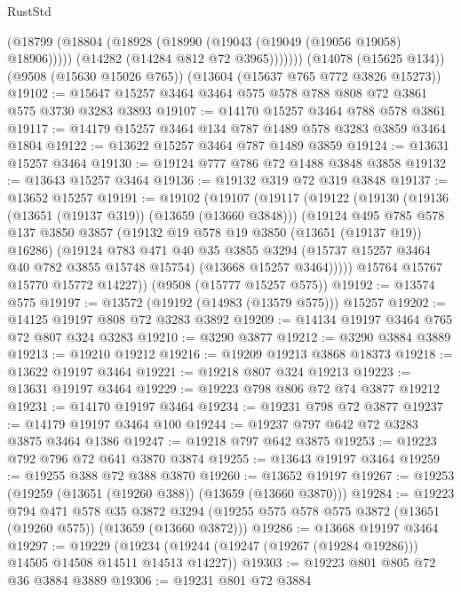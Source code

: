 \begin{lexlean}{RustStd}
\begin{coremodule}
            (@18799
              (@18804 (@18928 (@18990 (@19043 (@19049 (@19056 @19058) @18906)))))
              (@14282 (@14284 @812 @72 @3965)))))))
    (@14078 (@15625 @134))
    (@9508 (@15630 @15026 @765))
    (@13604 (@15637 @765 @772 @3826 @15273))
@19102 := @15647 @15257 @3464 @3464 @575 @578 @788 @808 @72 @3861 @575 @3730 @3283 @3893
@19107 := @14170 @15257 @3464 @788 @578 @3861
@19117 := @14179 @15257 @3464 @134 @787 @1489 @578 @3283 @3859 @3464 @1804
@19122 := @13622 @15257 @3464 @787 @1489 @3859
@19124 := @13631 @15257 @3464
@19130 := @19124 @777 @786 @72 @1488 @3848 @3858
@19132 := @13643 @15257 @3464
@19136 := @19132 @319 @72 @319 @3848
@19137 := @13652 @15257
@19191 := @19102
    (@19107
      (@19117
        (@19122
          (@19130
            (@19136 (@13651 (@19137 @319)) (@13659 (@13660 @3848)))
            (@19124
              @495
              @785
              @578
              @137
              @3850
              @3857
              (@19132 @19 @578 @19 @3850 (@13651 (@19137 @19)) @16286)
              (@19124
                @783
                @471
                @40
                @35
                @3855
                @3294
                (@15737 @15257 @3464 @40 @782 @3855 @15748 @15754)
                (@13668 @15257 @3464)))))
        @15764
        @15767
        @15770
        @15772
        @14227))
    (@9508 (@15777 @15257 @575))
@19192 := @13574 @575
@19197 := @13572 (@19192 (@14983 (@13579 @575))) @15257
@19202 := @14125 @19197 @808 @72 @3283 @3892
@19209 := @14134 @19197 @3464 @765 @72 @807 @324 @3283
@19210 := @3290 @3877
@19212 := @3290 @3884 @3889
@19213 := @19210 @19212
@19216 := @19209 @19213 @3868 @18373
@19218 := @13622 @19197 @3464
@19221 := @19218 @807 @324 @19213
@19223 := @13631 @19197 @3464
@19229 := @19223 @798 @806 @72 @74 @3877 @19212
@19231 := @14170 @19197 @3464
@19234 := @19231 @798 @72 @3877
@19237 := @14179 @19197 @3464 @100
@19244 := @19237 @797 @642 @72 @3283 @3875 @3464 @1386
@19247 := @19218 @797 @642 @3875
@19253 := @19223 @792 @796 @72 @641 @3870 @3874
@19255 := @13643 @19197 @3464
@19259 := @19255 @388 @72 @388 @3870
@19260 := @13652 @19197
@19267 := @19253 (@19259 (@13651 (@19260 @388)) (@13659 (@13660 @3870)))
@19284 := @19223
    @794
    @471
    @578
    @35
    @3872
    @3294
    (@19255 @575 @578 @575 @3872 (@13651 (@19260 @575)) (@13659 (@13660 @3872)))
@19286 := @13668 @19197 @3464
@19297 := @19229
    (@19234 (@19244 (@19247 (@19267 (@19284 @19286))) @14505 @14508 @14511 @14513 @14227))
@19303 := @19223 @801 @805 @72 @36 @3884 @3889
@19306 := @19231 @801 @72 @3884

\end{coremodule}
\end{lexlean}
